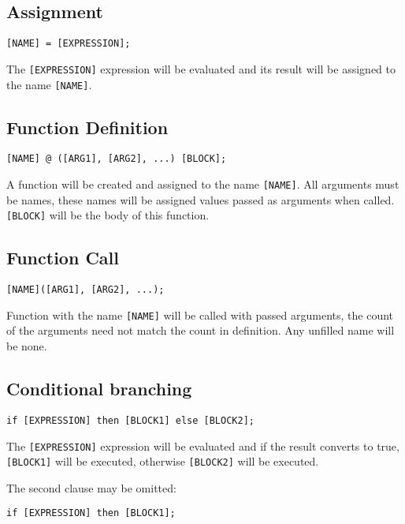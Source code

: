 \documentclass[a4paper,11pt,openany]{article}
\begin{document}
\subsection{Assignment}
\begin{lstlisting}[frame=none]
[NAME] = [EXPRESSION];
\end{lstlisting}

The \texttt{[EXPRESSION]} expression will be evaluated and its result will be assigned to the name \texttt{[NAME]}.

\subsection{Function Definition}
\begin{lstlisting}[frame=none]
[NAME] @ ([ARG1], [ARG2], ...) [BLOCK];
\end{lstlisting}
A function will be created and assigned to the name \texttt{[NAME]}. All arguments must be names, these names will be assigned values passed as arguments when called. \texttt{[BLOCK]} will be the body of this function.

\subsection{Function Call}
\begin{lstlisting}[frame=none]
[NAME]([ARG1], [ARG2], ...);
\end{lstlisting}
Function with the name \texttt{[NAME]} will be called with passed arguments, the count of the arguments need not match the count in definition. Any unfilled name will be none.

\subsection{Conditional branching}
\begin{lstlisting}[frame=none]
if [EXPRESSION] then [BLOCK1] else [BLOCK2];
\end{lstlisting}

The \texttt{[EXPRESSION]} expression will be evaluated and if the result converts to true, \texttt{[BLOCK1]} will be executed, otherwise \texttt{[BLOCK2]} will be executed.

The second clause may be omitted: 

\begin{lstlisting}[frame=none]
if [EXPRESSION] then [BLOCK1];
\end{lstlisting}
\end{document}
